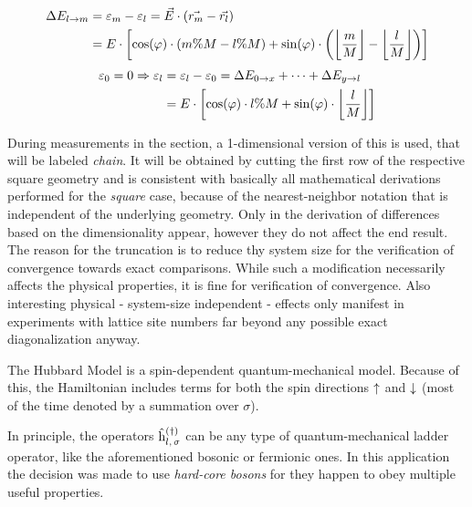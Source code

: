 \begin{equation}
    \label{eq:energy-difference-hopping}
    \begin{split}
        \Delta E_{l \rightarrow m} &=  \epsl[m] - \epsl[l] = \vec{E} \cdot \left(\vec{r_m}-\vec{r_l}\right)\\
        &= E \cdot \left[\cos(\varphi)\cdot \left(m \% M-l \% M\right) + \sin(\varphi)\cdot \left(\floor[\bigg]{\frac{m}{M}}-\floor[\bigg]{\frac{l}{M}}\right)\right]
    \end{split}
\end{equation}
\vspace{0.5cm} %
\begin{equation}
    \label{eq:epsl}
    \begin{split}
        \epsl[0] = 0 \Rightarrow
        \epsl[l] &= \epsl[l] - \epsl[0] = \Delta E_{0 \rightarrow x} + \dots + \Delta E_{y \rightarrow l}\\
        &= E \cdot \left[\cos(\varphi)\cdot l \% M + \sin(\varphi)\cdot \floor[\bigg]{\frac{l}{M}}\right]
    \end{split}
\end{equation}

During measurements in the  section, a 1-dimensional version of this is used, that will be labeled \emph{chain}. 
It will be obtained by cutting the first row of the respective square geometry and is consistent with basically all mathematical derivations performed for the \emph{square} case, because of the nearest-neighbor notation that is independent of the underlying geometry. Only in the derivation of  differences based on the dimensionality appear, however they do not affect the end result.
The reason for the truncation is to reduce thy system size for the verification of convergence towards exact comparisons.
While such a modification necessarily affects the physical properties, it is fine for verification of convergence.
Also interesting physical - system-size independent - effects only manifest in experiments with lattice site numbers far beyond any possible exact diagonalization anyway.

The Hubbard Model \cite{hubbardModelOriginalDerivation} is a spin-dependent quantum-mechanical model. 
Because of this, the Hamiltonian includes terms for both the spin directions $\up$ and $\down$ (most of the time denoted by a summation over $\sigma$).

In principle, the operators $\withspinhcop[]{l}{\sigma}{(\dagger)}$ can be any type of quantum-mechanical ladder operator, like the aforementioned bosonic or fermionic ones.
In this application the decision was made to use \emph{hard-core bosons} \cite[]{hardCoreBosonsBasics} for they happen to obey multiple useful properties.

